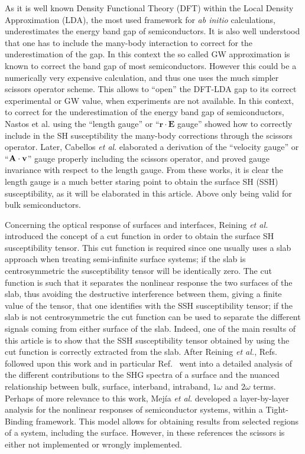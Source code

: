 \documentclass[floatfix,prb,aps,superscriptaddress,11pt,preprint,letterpaper]{revtex4}
\begin{document}
As it is well known
Density Functional Theory (DFT) within the Local Density Approximation
(LDA),\cite{??} the most 
used framework for \textit{ab initio} calculations,
underestimates the energy band gap of semiconductors. It is also well
understood that one has to include the many-body interaction to
correct for the underestimation of the gap. In this context the so
called GW approximation\cite{onidaRMP01} is known to correct the band
gap of most semiconductors\cite{cual}. However this could be a numerically very
expensive calculation, and thus one uses the much simpler scissors
operator scheme.\cite{?} This allows to ``open'' the DFT-LDA gap to
its correct experimental or GW value, when experiments are not available. 
In this context,
to correct for the underestimation of the energy band gap of semiconductors, 
Nastos et al.\cite{nastosPRB05} 
using the 
``length gauge'' or 
``$\mathbf{r}\cdot\mathbf{E}$ gauge'' 
showed how to correctly include in the SH susceptibility the many-body corrections through the
scissors operator.
Later,
Cabellos \textit{et al}.\cite{cabellosPRB09} 
elaborated a derivation of the ``velocity gauge'' or
``$\mathbf{A}\cdot\mathbf{v}$'' gauge properly including the scissors
operator, and proved  gauge 
invariance with respect to the length gauge.
From these works, it is clear the length gauge is a much better staring
point to obtain the surface SH (SSH) susceptibility, as it will be
elaborated in this article. Above only being valid for bulk semiconductors.

Concerning the optical response of surfaces and interfaces,
Reining \textit{et al.}\cite{reiningPRB94}  
introduced the concept of a 
cut function in order to obtain the surface SH 
susceptibility tensor.
This cut function is required since one usually uses a slab approach
when treating semi-infinite surface systems; if the slab is
centrosymmetric the susceptibility tensor will be identically zero.
The cut function is such that it separates the nonlinear response
 the two surfaces of the slab, thus avoiding the destructive
 interference between them, giving a finite value of the tensor, that
 one identifies with the SSH susceptibility tensor; if the slab is not
 centrosymmetric the cut function can be used to separate the
 different signals coming from either surface of the slab.
Indeed, one of the main results of this article is to show that the SSH 
susceptibility tensor obtained by using the cut function is 
correctly extracted from the slab.   
After Reining \textit{et al.}\cite{reiningPRB94}, 
Refs.~
followed upon this work and in particular Ref.~
went into a detailed analysis of the different contributions to the 
SHG spectra of a surface and the nuanced relationship between bulk, 
surface, interband, intraband, $1\omega$ and $2\omega$ terms. 
Perhaps of more relevance to this work, 
Mej\'ia \textit{et al}.\cite{mejiaRMF04} developed a layer-by-layer analysis for 
the nonlinear responses of semiconductor systems, within a 
Tight-Binding framework. This model 
allows for obtaining results from selected regions of a system,
including the surface. 
However, in these references the scissors is either not implemented or
wrongly implemented. 
\end{document}
